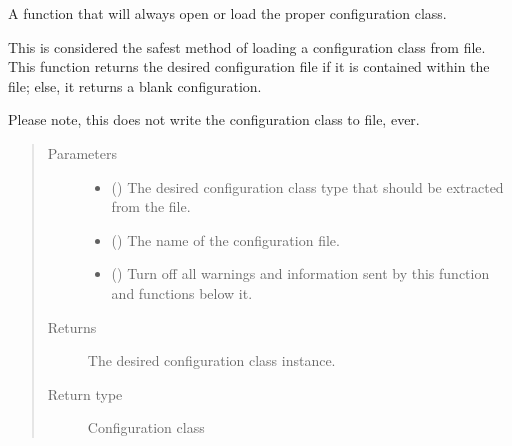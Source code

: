 \documentclass[letterpaper,10pt,english]{sphinxmanual}
\begin{document}
\begin{fulllineitems}
\label{\detokenize{python_docstrings/IfA_Smeargle.yankee.yankee_functions:IfA_Smeargle.yankee.yankee_functions.yankee_configuration_factory_function}}
A function that will always open or load the proper configuration
class.

This is considered the safest method of loading a configuration class
from file. This function returns the desired configuration file if it is
contained within the file; else, it returns a blank configuration.

Please note, this does not write the configuration class to file, ever.
\begin{quote}\begin{description}
\item[{Parameters}] \leavevmode\begin{itemize}
\item {} 
 () \textendash{} The desired configuration class type that should be extracted from the
file.

\item {} 
 (\sphinxstyleliteralemphasis{\sphinxupquote{ (}}\sphinxstyleliteralemphasis{\sphinxupquote{)}}) \textendash{} The name of the configuration file.

\item {} 
 (\sphinxstyleliteralemphasis{\sphinxupquote{ (}}\sphinxstyleliteralemphasis{\sphinxupquote{)}}) \textendash{} Turn off all warnings and information sent by this function and
functions below it.

\end{itemize}

\item[{Returns}] \leavevmode
{} \textendash{} The desired configuration class instance.

\item[{Return type}] \leavevmode
Configuration class

\end{description}\end{quote}

\end{fulllineitems}
\end{document}

